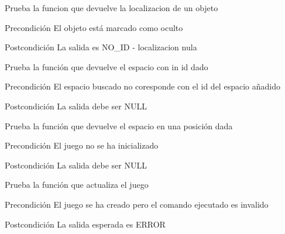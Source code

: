 \begin{DoxyRefList}
\item[\label{test__test000110}%
\hypertarget{test__test000110}{}%
Global \hyperlink{game__test_8c_ad415eade4b86f3d21cd9724add64478d}{test3\-\_\-game\-\_\-get\-\_\-object\-\_\-location} ()]Prueba la funcion que devuelve la localizacion de un objeto \begin{DoxyPrecond}{Precondición}
El objeto está marcado como oculto 
\end{DoxyPrecond}
\begin{DoxyPostcond}{Postcondición}
La salida es N\-O\-\_\-\-I\-D -\/ localizacion nula  
\end{DoxyPostcond}

\item[\label{test__test000088}%
\hypertarget{test__test000088}{}%
Global \hyperlink{game__test_8c_a8085aae7362a755633b2f14ac6481c5d}{test3\-\_\-game\-\_\-get\-\_\-space} ()]Prueba la función que devuelve el espacio con in id dado \begin{DoxyPrecond}{Precondición}
El espacio buscado no coresponde con el id del espacio añadido 
\end{DoxyPrecond}
\begin{DoxyPostcond}{Postcondición}
La salida debe ser N\-U\-L\-L  
\end{DoxyPostcond}

\item[\label{test__test000091}%
\hypertarget{test__test000091}{}%
Global \hyperlink{game__test_8c_a0170402c2a52e0fd2ec970ed38dfe62f}{test3\-\_\-game\-\_\-get\-\_\-space\-\_\-at} ()]Prueba la función que devuelve el espacio en una posición dada \begin{DoxyPrecond}{Precondición}
El juego no se ha inicializado 
\end{DoxyPrecond}
\begin{DoxyPostcond}{Postcondición}
La salida debe ser N\-U\-L\-L  
\end{DoxyPostcond}

\item[\label{test__test000065}%
\hypertarget{test__test000065}{}%
Global \hyperlink{game__test_8c_a6cd456a4f2fdd65c76858fee06959555}{test3\-\_\-game\-\_\-update} ()]Prueba la función que actualiza el juego \begin{DoxyPrecond}{Precondición}
El juego se ha creado pero el comando ejecutado es invalido 
\end{DoxyPrecond}
\begin{DoxyPostcond}{Postcondición}
La salida esperada es E\-R\-R\-O\-R  
\end{DoxyPostcond}


\end{DoxyRefList}
